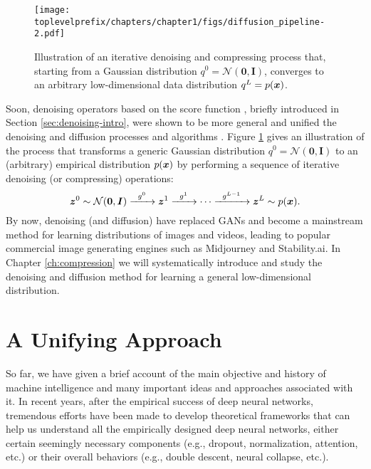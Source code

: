 \documentclass[../../book-main.tex]{subfiles}
\begin{document}
\begin{figure}[t]
    \centering
    \texttt{[image: \\toplevelprefix/chapters/chapter1/figs/diffusion\_pipeline-2.pdf]}
    \caption{Illustration of an iterative denoising and compressing process that, starting from a Gaussian distribution $q^0 = \mathcal{N}(\boldsymbol{0}, \boldsymbol{I})$, converges to an arbitrary low-dimensional data distribution $q^L = p(\bm{x})$. }
    \label{fig:diffusion}
\end{figure}

Soon, denoising operators based on the score function \cite{hyvarinen05a}, briefly introduced in Section \ref{sec:denoising-intro}, were shown to be more general and unified the denoising and diffusion processes and algorithms \cite{song2019,song2020score,ho2020denoising}. Figure \ref{fig:diffusion} gives an illustration of the process that transforms a generic Gaussian distribution $q^0 = \mathcal{N}(\boldsymbol{0}, \boldsymbol{I})$ to an (arbitrary) empirical distribution $p(\bm{x})$ by performing a sequence of iterative denoising (or compressing) operations:
\begin{equation}
        \bm{z}^0 \sim  \mathcal{N}(\boldsymbol{0}, \boldsymbol{I})\xrightarrow{\hspace{2mm} g^0  \hspace{2mm}} \bm{z}^1 \xrightarrow{\hspace{2mm} g^1 \hspace{2mm}} \cdots \xrightarrow{\hspace{2mm} g^{L-1}  \hspace{2mm}} \bm{z}^L \sim p(\bm{x}).
\end{equation}
By now, denoising (and diffusion) have replaced GANs and become a mainstream method for learning distributions of images and videos, leading to popular commercial image generating engines such as Midjourney and Stability.ai. 
In Chapter \ref{ch:compression} we will systematically introduce and study the denoising and diffusion method for learning a general low-dimensional distribution.  



\section{A Unifying Approach}\label{sec:unifying-approach}
So far, we have given a brief account of the main objective and history of machine intelligence and many important ideas and approaches associated with it. In recent years, after the empirical success of deep neural networks, tremendous efforts have been made to develop theoretical frameworks that can help us understand all the empirically designed deep neural networks, either certain seemingly necessary components (e.g., dropout,  normalization, attention, etc.) or their overall behaviors (e.g., double descent, neural collapse,  etc.). 
\end{document}
